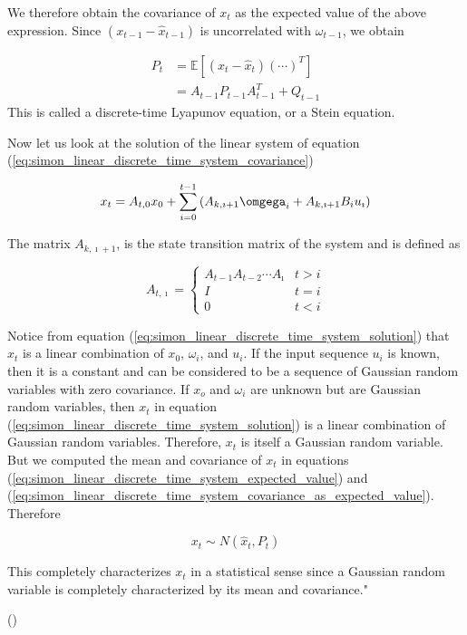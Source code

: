 {We therefore obtain the covariance of \(x_t\) as the expected value of the above expression. Since \((x_{t-1} - \hat{x}_{t-1})\) is uncorrelated with \(\omega_{t-1}\), we obtain

\begin{equation}
\begin{aligned}
P_t &= \mathbb{E}[(x_t - \hat{x}_t)(\cdots)^T] \\
    &= A_{t-1}P_{t-1}A^T_{t-1} + Q_{t-1}
\label{eq:simon_linear_discrete_time_system_covariance_as_expected_value}
\end{aligned}    
\end{equation}
This is called a discrete-time Lyapunov equation, or a Stein equation. 

Now let us look at the solution of the linear system of equation (\ref{eq:simon_linear_discrete_time_system_covariance})

\begin{equation}
x_t=A_{t, 0} x_0+\sum_{i=0}^{t-1}\left(A_{k, \imath+1} \omgega_i+A_{k, \imath+1} B_i u_{\imath}\right)
\label{eq:simon_linear_discrete_time_system_solution}
\end{equation}

The matrix \(A_{k, \imath+1}\), is the state transition matrix of the system and is defined as

\begin{equation}
A_{t, \imath}= \begin{cases}A_{t-1} A_{t-2} \cdots A_{\imath} & t>i \\ I & t=i \\ 0 & t<i\end{cases}
\end{equation}

Notice from equation (\ref{eq:simon_linear_discrete_time_system_solution}) that \(x_t\) is a linear combination of \(x_0\), \({\omega_i}\), and \({u_i}\).
If the input sequence \({u_i}\) is known, then it is a constant and can be considered to be a sequence of Gaussian random variables with zero covariance. If \(x_o\) and \({\omega_i}\) are unknown but are Gaussian random variables, then \(x_t\) in equation (\ref{eq:simon_linear_discrete_time_system_solution}) is a linear combination of Gaussian random variables. Therefore, \(x_t\) is itself a Gaussian
random variable. But we computed the mean and covariance of
\(x_t\) in equations (\ref{eq:simon_linear_discrete_time_system_expected_value}) and (\ref{eq:simon_linear_discrete_time_system_covariance_as_expected_value}). Therefore

\begin{equation}
x_t \sim N(\hat{x}_t,P_t)
\end{equation}

This completely characterizes \(x_t\) in a statistical sense since a Gaussian random
variable is completely characterized by its mean and covariance."
}
(\cite[page~107-108]{simon_optimal_2006})


